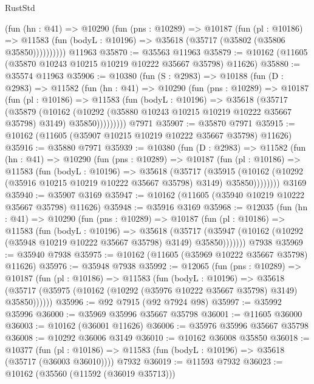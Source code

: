 \begin{lexlean}{RustStd}
\begin{coremodule}
          (fun (hn : @41) =>
          @10290
            (fun (pns : @10289) =>
            @10187
              (fun (pl : @10186) =>
              @11583 (fun (bodyL : @10196) => @35618 (@35717 (@35802 (@35806 @35850))))))))))
    @11963
@35870 := @35563 @11963
@35879 := @10162 (@11605 (@35870 @10243 @10215 @10219 @10222 @35667 @35798) @11626)
@35880 := @35574 @11963
@35906 := @10380
    (fun (S : @2983) =>
    @10188
      (fun (D : @2983) =>
      @11582
        (fun (hn : @41) =>
        @10290
          (fun (pns : @10289) =>
          @10187
            (fun (pl : @10186) =>
            @11583
              (fun (bodyL : @10196) =>
              @35618
                (@35717
                  (@35879
                    (@10162
                      (@10292 (@35880 @10243 @10215 @10219 @10222 @35667 @35798) @3149)
                      @35850)))))))))
    @7971
@35907 := @35870 @7971
@35915 := @10162 (@11605 (@35907 @10215 @10219 @10222 @35667 @35798) @11626)
@35916 := @35880 @7971
@35939 := @10380
    (fun (D : @2983) =>
    @11582
      (fun (hn : @41) =>
      @10290
        (fun (pns : @10289) =>
        @10187
          (fun (pl : @10186) =>
          @11583
            (fun (bodyL : @10196) =>
            @35618
              (@35717
                (@35915
                  (@10162 (@10292 (@35916 @10215 @10219 @10222 @35667 @35798) @3149) @35850))))))))
    @3169
@35940 := @35907 @3169
@35947 := @10162 (@11605 (@35940 @10219 @10222 @35667 @35798) @11626)
@35948 := @35916 @3169
@35968 := @12035
    (fun (hn : @41) =>
    @10290
      (fun (pns : @10289) =>
      @10187
        (fun (pl : @10186) =>
        @11583
          (fun (bodyL : @10196) =>
          @35618
            (@35717
              (@35947 (@10162 (@10292 (@35948 @10219 @10222 @35667 @35798) @3149) @35850)))))))
    @7938
@35969 := @35940 @7938
@35975 := @10162 (@11605 (@35969 @10222 @35667 @35798) @11626)
@35976 := @35948 @7938
@35992 := @12065
    (fun (pns : @10289) =>
    @10187
      (fun (pl : @10186) =>
      @11583
        (fun (bodyL : @10196) =>
        @35618 (@35717 (@35975 (@10162 (@10292 (@35976 @10222 @35667 @35798) @3149) @35850))))))
@35996 := @92 @7915 (@92 @7924 @98)
@35997 := @35992 @35996
@36000 := @35969 @35996 @35667 @35798
@36001 := @11605 @36000
@36003 := @10162 (@36001 @11626)
@36006 := @35976 @35996 @35667 @35798
@36008 := @10292 @36006 @3149
@36010 := @10162 @36008 @35850
@36018 := @10377
    (fun (pl : @10186) => @11583 (fun (bodyL : @10196) => @35618 (@35717 (@36003 @36010))))
    @7932
@36019 := @11593 @7932
@36023 := @10162 (@35560 (@11592 (@36019 @35713)))

\end{coremodule}
\end{lexlean}
